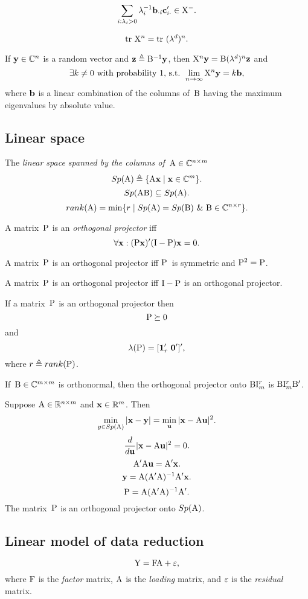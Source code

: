 \documentclass[10pt,a4paper]{article}
\theoremstyle{plain} \newtheorem{Lem}{Lemma}
\begin{document}
$$ \sum_{i:\lambda_i > 0} \lambda_i^{-1} \mathbf b_{\cdot i} \mathbf c_{i \cdot}' \in \mathrm X^-. $$

$$ \mathrm {tr} \  \mathrm X^n = \mathrm {tr} \  (\mathbf \lambda^d)^n. $$

If $\mathbf y \in \mathbb C^n$ is a random vector and $\mathbf z \triangleq \mathrm B^{-1} \mathbf y$, then $\mathrm X^n \mathbf y = \mathrm B (\mathbf \lambda^d)^n \mathbf z$ and
$$ \exists k \ne 0 \text{ with probability 1, s.t. } \lim_{n \to \infty} \mathrm X^n \mathbf y = k \mathbf b, $$
where $\mathbf b$ is a linear combination of the columns of~$\mathrm B$ having the maximum eigenvalues by absolute value.


\subsection{Linear space}

The {\em linear space spanned by the columns of~$\mathrm A \in \mathbb C^{n \times m}$}
$$ Sp(\mathrm A) \triangleq \{\mathrm A \mathbf x \mid \mathbf x \in \mathbb C^m\}. $$
$$ Sp(\mathrm A \mathrm B) \subseteq Sp(\mathrm A). $$
$$ rank(\mathrm A) = \min \{r \mid Sp(\mathrm A) = Sp(\mathrm B) \ \& \  \mathrm B \in \mathbb C^{n \times r} \}. $$

A matrix~$\mathrm P$ is an {\em orthogonal projector} iff 
$$ \forall \mathbf x : (\mathrm P \mathbf x)' (\mathrm I - \mathrm P) \mathbf x = 0. $$

A matrix~$\mathrm P$ is an orthogonal projector iff $\mathrm P$~is symmetric and $\mathrm P^2 = \mathrm P$.

A matrix~$\mathrm P$ is an orthogonal projector iff $\mathrm I - \mathrm P$ is an orthogonal projector.

If a matrix~$\mathrm P$ is an orthogonal projector 
then 
$$ \mathrm P \succeq 0 $$
and
$$ \mathbf \lambda(\mathrm P) = [\mathbf 1_r' \ \mathbf 0']', $$
where $r \triangleq rank(\mathrm P)$.

If~$\mathrm B \in \mathbb C^{m \times m}$ is orthonormal,
then the orthogonal projector onto $\mathrm B \mathrm I^r_m$ is $\mathrm B \mathrm I^r_m \mathrm B'$.

Suppose $\mathrm A \in \mathbb R^{n \times m}$ and $\mathbf x \in \mathbb R^m$.
Then
$$ \min_{y \in Sp(\mathrm A)} |\mathbf x - \mathbf y| = \min_{\mathbf u} |\mathbf x - \mathrm A \mathbf u|^2. $$
$$ \frac d {d \mathbf u} |\mathbf x - \mathrm A \mathbf u|^2 = 0. $$
$$ \mathrm A' \mathrm A \mathbf u = \mathrm A' \mathbf x. $$
$$ \mathbf y = \mathrm A (\mathrm A' \mathrm A)^{-1} \mathrm A' \mathbf x. $$
$$ \mathrm P = \mathrm A (\mathrm A' \mathrm A)^{-1} \mathrm A'. $$
The matrix~$\mathrm P$ is an orthogonal projector onto $Sp(\mathrm A)$.


\subsection {Linear model of data reduction}
$$ \mathrm Y = \mathrm F \mathrm A + \mathrm \varepsilon, $$
where $\mathrm F$ is the {\em factor} matrix,
$\mathrm A$ is the {\em loading} matrix,
and $\mathrm \varepsilon$ is the {\em residual} matrix.
\end{document}
